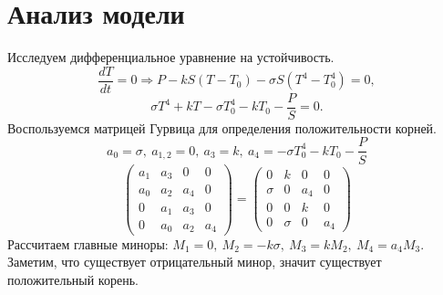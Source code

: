 \section{Анализ модели}
    Исследуем дифференциальное уравнение на устойчивость.
    \[
        \frac{dT}{dt} = 0 \Rightarrow  P - k S (T - T_0) - \sigma S (T^4 - T_0^4) = 0,
    \]
    \[
        \sigma T^4 + k T - \sigma T_0^4 - k T_0 - \frac{P}{S} = 0.
    \]
    Воспользуемся матрицей Гурвица для определения положительности корней.
    \[
        a_0 = \sigma, ~ a_{1,2} = 0, ~ a_3 = k, ~ a_4 = - \sigma T_0^4 - k T_0 - \frac{P}{S} 
    \]
    \[
        \left(\begin{matrix}
            a_1 & a_3 & 0 & 0 \\
            a_0 & a_2 & a_4 & 0 \\
            0 & a_1 & a_3 & 0 \\
            0 & a_0 & a_2 & a_4
        \end{matrix}\right) 
        =
        \left(\begin{matrix}
            0 & k & 0 & 0 \\
            \sigma & 0 & a_4 & 0 \\
            0 & 0 & k & 0 \\
            0 & \sigma & 0 & a_4
        \end{matrix}\right) 
    \]
    Рассчитаем главные миноры: \( M_1 = 0, ~ M_2 = - k \sigma, ~ M_3 = k M_2, ~ M_4 = a_4 M_3 \). Заметим, что существует отрицательный минор, значит существует положительный корень.